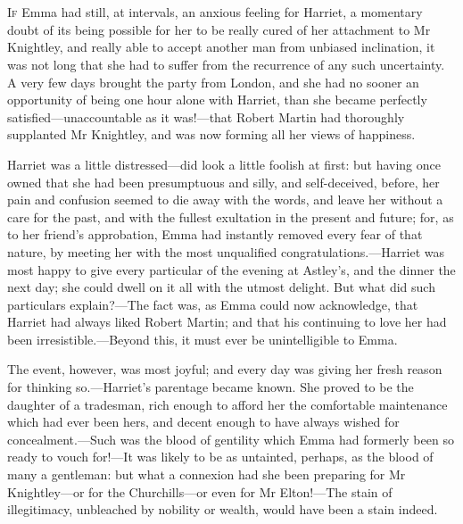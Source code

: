 \chapter[Chapter \thechapter]{}
\lettrine[lines=4,lraise=0.3]{I}{f} Emma had still, at intervals, an anxious feeling for Harriet, a momentary doubt of its being possible for her to be really cured of her attachment to Mr Knightley, and really able to accept another man from unbiased inclination, it was not long that she had to suffer from the recurrence of any such uncertainty. A very few days brought the party from London, and she had no sooner an opportunity of being one hour alone with Harriet, than she became perfectly satisfied—unaccountable as it was!—that Robert Martin had thoroughly supplanted Mr Knightley, and was now forming all her views of happiness.

Harriet was a little distressed—did look a little foolish at first: but having once owned that she had been presumptuous and silly, and self-deceived, before, her pain and confusion seemed to die away with the words, and leave her without a care for the past, and with the fullest exultation in the present and future; for, as to her friend's approbation, Emma had instantly removed every fear of that nature, by meeting her with the most unqualified congratulations.—Harriet was most happy to give every particular of the evening at Astley's, and the dinner the next day; she could dwell on it all with the utmost delight. But what did such particulars explain?—The fact was, as Emma could now acknowledge, that Harriet had always liked Robert Martin; and that his continuing to love her had been irresistible.—Beyond this, it must ever be unintelligible to Emma.

The event, however, was most joyful; and every day was giving her fresh reason for thinking so.—Harriet's parentage became known. She proved to be the daughter of a tradesman, rich enough to afford her the comfortable maintenance which had ever been hers, and decent enough to have always wished for concealment.—Such was the blood of gentility which Emma had formerly been so ready to vouch for!—It was likely to be as untainted, perhaps, as the blood of many a gentleman: but what a connexion had she been preparing for Mr Knightley—or for the Churchills—or even for Mr Elton!—The stain of illegitimacy, unbleached by nobility or wealth, would have been a stain indeed.

